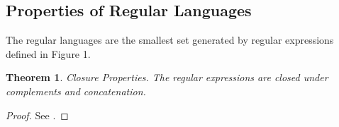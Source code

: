 \documentclass[10pt,preprint]{sigplanconf}
\newtheorem{thm}{Theorem}
\theoremstyle{definition}
\newtheorem{defn}[thm]{Definition}
\newcommand{\ifilter}[2]{ {\tt ifilter}(#1,#2) }
\newcommand{\tstrf}[1]{`#1\textrm'} %
\newcommand{\lcs}{\lambda_{CS}}
\begin{document}
%
%
%
\subsection{Properties of Regular Languages}

The regular languages are the smallest set generated by regular expressions
defined in Figure 1.

\begin{thm}{Closure Properties.} \label{thm:closure}
The regular expressions are closed under complements and concatenation.
\end{thm}
\begin{proof}
See \cite{cinderella}.
\end{proof}
\end{document}
